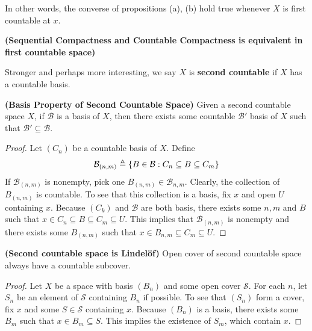 \documentclass{report}
\begin{document}
\begin{mdframed}




In other words, the converse of propositions (a), (b) hold true whenever $X$ is first countable at  $x$. 
\end{mdframed}
\begin{theorem}
\textbf{(Sequential Compactness and Countable Compactness is equivalent in first countable space)}
\end{theorem}
\begin{mdframed}
Stronger and perhaps more interesting, we say $X$ is \textbf{second countable} if $X$ has a countable basis.  
\end{mdframed}
\begin{theorem}
\label{Basis Property of Second Countable Space}
\textbf{(Basis Property of Second Countable Space)} Given a second countable space $X$, if  $\mathcal{B}$ is a basis of $X$, then there exists some countable $\mathcal{B}'$ basis of $X$ such that $\mathcal{B}'\subseteq \mathcal{B}$. 
\end{theorem}
\begin{proof}
Let $(C_n)$ be a countable basis of $X$. Define 
\begin{align*}
\mathcal{B}_{(n,m)}\triangleq \{ B \in \mathcal{B}: C_n \subseteq B \subseteq C_m \}
\end{align*}
If $\mathcal{B}_{(n,m)}$ is nonempty, pick one $B_{(n,m)}\in \mathcal{B}_{n,m}$. Clearly, the collection of $B_{(n,m)}$ is countable. To see that this collection is a basis, fix $x$ and open  $U$ containing $x$. Because  $(C_k)$ and $\mathcal{B}$ are both basis, there exists some $n,m$ and $B$ such that $x \in C_n \subseteq B \subseteq C_m \subseteq U$. This implies that $\mathcal{B}_{(n,m)}$ is nonempty and there exists some $B_{(n,m)}$ such that $x\in B_{n,m}\subseteq C_m \subseteq U$. 
\end{proof}
\begin{theorem}
\label{Basic Property of Second Countable Space}
\textbf{(Second countable space is Lindelöf)} Open cover of second countable space always have a countable subcover. 
\end{theorem}
\begin{proof}
Let $X$ be a space with basis  $(B_n)$ and some open cover  $\mathcal{S}$. For each $n$, let $S_n$ be an element of  $\mathcal{S}$ containing $B_n$ if possible. To see that  $(S_n)$ form a cover, fix $x$ and some $S \in \mathcal{S}$ containing $x$. Because $(B_n)$ is a basis, there exists some $B_m$ such that  $x \in B_m \subseteq S$. This implies the existence of $S_m$, which contain $x$.  
\end{proof}
\end{document}

